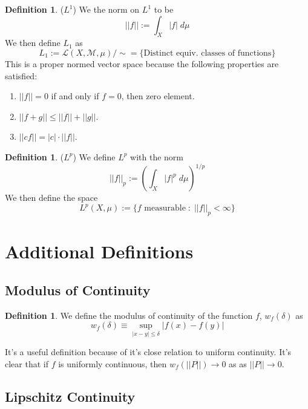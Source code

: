 \documentclass[12pt]{article}
\theoremstyle{plain}
\theoremstyle{definition}
\newtheorem{defn}[thm]{Definition}
\theoremstyle{remark}
\begin{document}
\begin{defn} ($L^1$) We the norm on $L^1$ to be
\[
    ||f||:= \int_X |f| \; d\mu
\]
We then define $L_1$ as
\[
    L_1 := \mathscr{L}(X,\mathscr{M},\mu) / \sim
    = \{\text{Distinct equiv. classes of functions}\}
\]
This is a proper normed vector space because the following properties are satisfied:
\begin{enumerate}
    \item $||f|| = 0$ if and only if $f=0$, then zero element.
    \item $||f+g||\leq ||f|| + ||g||$.
    \item $||c f|| = |c| \cdot ||f||$.
\end{enumerate}
\end{defn}

\begin{defn} ($L^p$) We define $L^p$ with the norm
\[
    ||f||_p:= \left(\int_X |f|^p \; d\mu\right)^{1/p}
\]
We then define the space
\[
    L^p(X,\mu) := \{\text{$f$ measurable}\;:\;
    \text{$||f||_p < \infty$}\}
\]
\end{defn}





\newpage
\appendix


\section{Additional Definitions}

\subsection{Modulus of Continuity}

\begin{defn} We define the modulus of continuity of the function $f$, $w_f(\delta)$ as 
\begin{equation}
    w_f(\delta) \equiv \sup_{|x-y|\leq\delta} |f(x)-f(y)|
\end{equation}
\end{defn}
It's a useful definition because of it's close relation to uniform continuity.
It's clear that if $f$ is uniformly continuous, then $w_f\left(||P||\right)\rightarrow0$ as as $||P||\rightarrow0$.

\subsection{Lipschitz Continuity} 
\end{document}
